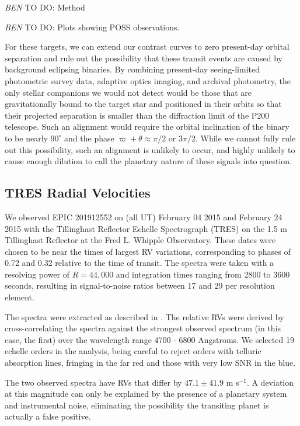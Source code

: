 \documentclass{emulateapj}
\newcommand{\todo}[3]{{\color{#2} \emph{#1} TO DO: #3}}
\newcommand{\btmtodo}[1]{\todo{BEN}{red}{#1}}
\begin{document}
\btmtodo{Method}

\btmtodo{Plots showing POSS observations.}

For these targets, we can extend our contrast curves to zero
present-day orbital separation and rule out the possibility that
these transit events are caused by background eclipsing binaries.
By combining present-day seeing-limited photometric survey data,
adaptive optics imaging, and archival photometry, the only stellar companions
we would not detect would be those that are gravitationally bound to the target
star and positioned in their orbits so that their projected separation is
smaller than the diffraction limit of the P200 telescope.
Such an alignment would require the orbital inclination of the binary to be
nearly $90^\circ$ and the phase $\varpi + \theta \approx \pi/2$ or $3\pi/2$.
While we cannot fully rule out this possibility, such an alignment is unlikely
to occur, and highly unlikely to cause enough dilution to call the planetary
nature of these signals into question.




\subsection{TRES Radial Velocities}

We observed EPIC 201912552 on (all UT) February 04 2015 and February 24 2015
with the Tillinghast Reflector Echelle
Spectrograph (TRES) on the 1.5 m Tillinghast Reflector at the Fred L.
Whipple Observatory.
These dates were chosen to be near the times of largest RV variations,
corresponding to phases of 0.72 and 0.32 relative to the time
of transit.
The spectra were taken with a resolving power of $R=44,000$ and
integration times ranging from 2800 to 3600 seconds, resulting in
signal-to-noise ratios between 17 and 29 per resolution element.

The spectra were extracted as described in \citet{Buchhave10}.
The relative RVs were derived by cross-correlating the spectra against the
strongest observed spectrum (in this case, the first) over the wavelength
range 4700 - 6800 Angstroms.
We selected 19 echelle orders in the analysis, being careful to reject
orders with telluric absorption lines, fringing in the far red and those
with very low SNR in the blue.

The two observed spectra have RVs that differ by $47.1 \pm 41.9$ m s$^{-1}$.
A deviation at this magnitude can only be explained by the presence of
a planetary system and instrumental noise, eliminating the possibility the
transiting planet is actually a false positive.
\end{document}
